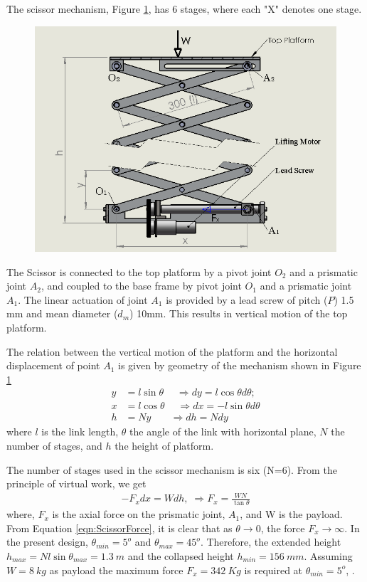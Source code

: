 The scissor mechanism, Figure \ref{fig:scissor}, has 6 stages, where each "X" denotes one stage. 
\begin{figure}
	\centering
	\includegraphics[width=.8\linewidth,keepaspectratio]{Chapter3/fig/scissor}
	\label{fig:scissor}
\end{figure}
The Scissor is connected to the top platform by a pivot joint $O_2$ and a prismatic joint $ A_2$, and coupled to the base frame by pivot joint $O_1$ and a prismatic joint $A_1$. The linear actuation of joint $A_1$ is provided by a lead screw of pitch ($P$) 1.5 mm and mean diameter ($d_m$) 10mm.  This results in vertical motion of the top platform. 
  
 The relation between the vertical motion of the platform and the horizontal displacement of point $A_1$ is given by geometry of the mechanism shown in Figure \ref{fig:scissor} 
\begin{equation}
\begin{aligned}
y&=l\sin\theta\;\quad \Rightarrow dy=l\cos\theta d\theta;\\
 x&=l\cos\theta \; \quad \Rightarrow dx=-l\sin\theta d\theta\\
h&=Ny~~~\; \quad\Rightarrow dh=Ndy
\end{aligned}
\end{equation} 
where $l$ is the link length, $\theta$ the angle of the link with horizontal plane, $N$ the number of stages, and $h$ the height of platform.


The number of stages used in the scissor mechanism is six (N=6). From the principle of virtual work, we get 
\begin{equation}
\label{eqn:ScissorForce}
\begin{aligned}
-F_xdx=Wdh,\;\Rightarrow F_x=\frac{WN}{\tan\theta}
\end{aligned}
\end{equation}
where, $F_x$ is the axial force on the prismatic joint, $A_1$, and W is the payload. From Equation \ref{eqn:ScissorForce}, it is clear that as $\theta\rightarrow 0$, the force  $F_x \rightarrow \infty$. In the present design,  $\theta_{min}=5^o$ and $\theta_{max}=45^o$. Therefore, the extended height  $h_{max}=Nl\sin\theta_{max}=1.3~m$ and the collapsed height $h_{min}=156~mm$. Assuming $W=8~kg$ as payload the maximum force $F_x=342~Kg$ is required at $\theta_{min}=5^o$, . 


